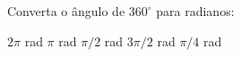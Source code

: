 Converta o ângulo de $360^\circ$ para radianos:

\parbox{\linewidth}{

$2\pi$ rad
$\pi$ rad
$\pi/2$ rad
$3\pi/2$ rad
$\pi/4$ rad

}


